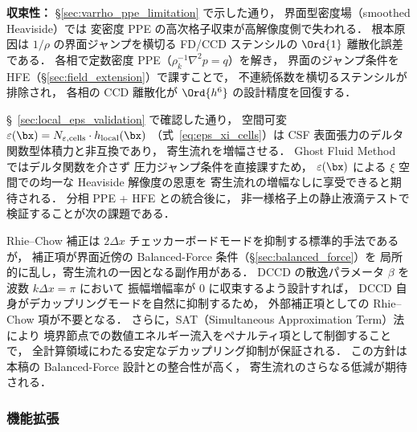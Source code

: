 \begin{description}
        \textbf{収束性：}
        §\ref{sec:varrho_ppe_limitation} で示した通り，
        界面型密度場（smoothed Heaviside）では
        変密度 PPE の高次格子収束が高解像度側で失われる．
        根本原因は $1/\rho$ の界面ジャンプを横切る FD/CCD ステンシルの $\Ord{1}$ 離散化誤差である．
        各相で定数密度 PPE（$\rho_k^{-1}\nabla^2 p = q$）を解き，
        界面のジャンプ条件を HFE（§\ref{sec:field_extension}）で課すことで，
        不連続係数を横切るステンシルが排除され，
        各相の CCD 離散化が $\Ord{h^6}$ の設計精度を回復する．

  \item[\textbf{GFM 表面張力と空間可変 \texorpdfstring{$\varepsilon(\bx)$}{eps(x)} の結合：}]
        §~\ref{sec:local_eps_validation} で確認した通り，
        空間可変 $\varepsilon(\bx) = N_{\varepsilon,\text{cells}} \cdot h_{\mathrm{local}}(\bx)$
        （式~\eqref{eq:eps_xi_cells}）は
        CSF 表面張力のデルタ関数型体積力と非互換であり，
        寄生流れを増幅させる．
        Ghost Fluid Method~\cite{Kang2000} ではデルタ関数を介さず
        圧力ジャンプ条件を直接課すため，
        $\varepsilon(\bx)$ による $\xi$ 空間での均一な Heaviside 解像度の恩恵を
        寄生流れの増幅なしに享受できると期待される．
        分相 PPE + HFE との統合後に，
        非一様格子上の静止液滴テストで検証することが次の課題である．

  \item[\textbf{DCCD 内在的散逸による Rhie--Chow 補正の排除：}]
        Rhie--Chow 補正は $2\Delta x$ チェッカーボードモードを抑制する標準的手法であるが，
        補正項が界面近傍の Balanced-Force 条件（§\ref{sec:balanced_force}）を
        局所的に乱し，寄生流れの一因となる副作用がある．
        DCCD の散逸パラメータ $\beta$ を波数 $k\Delta x = \pi$ において
        振幅増幅率が $0$ に収束するよう設計すれば，
        DCCD 自身がデカップリングモードを自然に抑制するため，
        外部補正項としての Rhie--Chow 項が不要となる．
        さらに，SAT（Simultaneous Approximation Term）法により
        境界節点での数値エネルギー流入をペナルティ項として制御することで，
        全計算領域にわたる安定なデカップリング抑制が保証される．
        この方針は本稿の Balanced-Force 設計との整合性が高く，
        寄生流れのさらなる低減が期待される．
\end{description}

\subsubsection{機能拡張}

